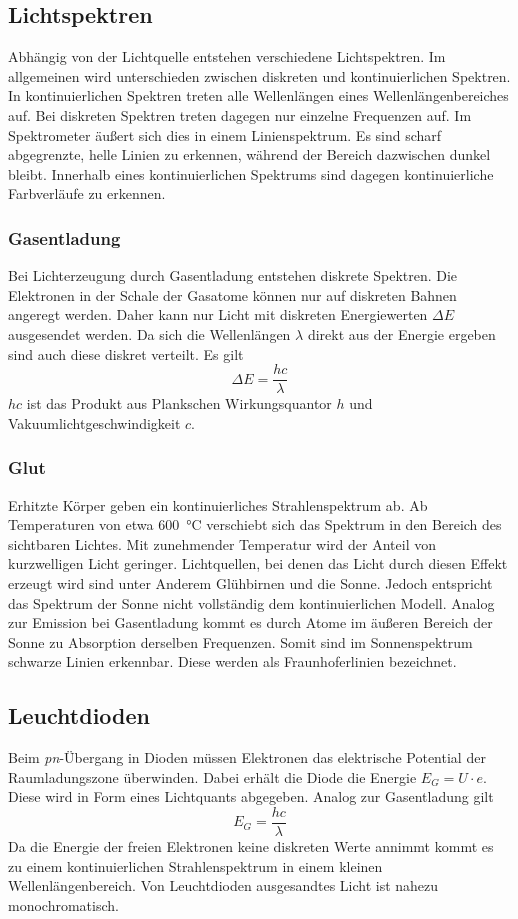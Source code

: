 \subsection{Lichtspektren}
Abhängig von der Lichtquelle entstehen verschiedene Lichtspektren. Im allgemeinen wird unterschieden zwischen diskreten und kontinuierlichen Spektren. In kontinuierlichen Spektren treten alle Wellenlängen eines Wellenlängenbereiches auf. Bei diskreten Spektren treten dagegen nur einzelne Frequenzen auf. Im Spektrometer äußert sich dies in einem Linienspektrum. Es sind  scharf abgegrenzte, helle Linien zu erkennen, während der Bereich dazwischen dunkel bleibt. Innerhalb eines kontinuierlichen Spektrums sind dagegen kontinuierliche Farbverläufe zu erkennen. 
\subsubsection{Gasentladung}
Bei Lichterzeugung durch Gasentladung entstehen diskrete Spektren. Die Elektronen in der Schale der Gasatome können nur auf diskreten Bahnen angeregt werden. Daher kann nur Licht mit diskreten Energiewerten $ \Delta E $ ausgesendet werden. Da sich die Wellenlängen $ \lambda $ direkt aus der Energie ergeben sind auch diese diskret verteilt. Es gilt
\begin{equation}
	\Delta E = \frac{hc}{\lambda}
\end{equation}
$ hc $ ist das Produkt aus Plankschen Wirkungsquantor $ h $ und Vakuumlichtgeschwindigkeit $ c $.

\subsubsection{Glut}
Erhitzte Körper geben ein kontinuierliches Strahlenspektrum ab. Ab Temperaturen von etwa \SI{600}{\degreeCelsius} verschiebt sich das Spektrum in den Bereich des sichtbaren Lichtes. Mit zunehmender Temperatur wird der Anteil von kurzwelligen Licht geringer. Lichtquellen, bei denen das Licht durch diesen Effekt erzeugt wird sind unter Anderem Glühbirnen und die Sonne. Jedoch entspricht das Spektrum der Sonne nicht vollständig dem kontinuierlichen Modell. Analog zur Emission bei Gasentladung kommt es durch Atome im äußeren Bereich der Sonne zu Absorption derselben Frequenzen. Somit sind im Sonnenspektrum schwarze Linien erkennbar. Diese werden als Fraunhoferlinien bezeichnet.

\subsection{Leuchtdioden}
Beim \textit{pn}-Übergang in Dioden müssen Elektronen das elektrische Potential der Raumladungszone überwinden. Dabei erhält die Diode die Energie $ E_G = U \cdot e $. Diese wird in Form eines Lichtquants abgegeben. Analog zur Gasentladung gilt
\begin{equation}
	E_G = \frac{hc}{\lambda}
\end{equation}
Da die Energie der freien Elektronen keine diskreten Werte annimmt kommt es zu einem kontinuierlichen Strahlenspektrum in einem kleinen Wellenlängenbereich. Von Leuchtdioden ausgesandtes Licht ist nahezu monochromatisch.
\newpage
